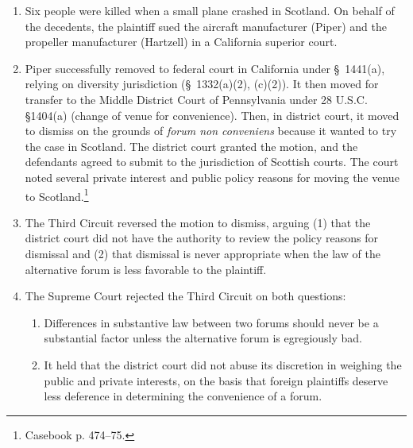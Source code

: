 \begin{enumerate}
    \item Six people were killed when a small plane crashed in Scotland. On 
    behalf of the decedents, the plaintiff sued the aircraft manufacturer 
    (Piper) and the propeller manufacturer (Hartzell) in a California superior 
    court.
    \item Piper successfully removed to federal court in California under \S\ 
    1441(a), relying on diversity jurisdiction (\S\ 1332(a)(2), (c)(2)). It 
    then moved for transfer to the Middle District Court of Pennsylvania under 
    28 U.S.C. §1404(a) (change of venue for convenience). Then, in district 
    court, it moved to dismiss on the grounds of \emph{forum non conveniens} 
    because it wanted to try the case in Scotland. The district court granted 
    the motion, and the defendants agreed to submit to the jurisdiction of 
    Scottish courts.  The court noted several private interest and public 
    policy reasons for moving the venue to Scotland.\footnote{Casebook p.  
    474--75.}
    \item The Third Circuit reversed the motion to dismiss, arguing (1) that 
    the district court did not have the authority to review the policy reasons 
    for dismissal and (2) that dismissal is never appropriate when the law of 
    the alternative forum is less favorable to the plaintiff.
    \item The Supreme Court rejected the Third Circuit on both questions:
    \begin{enumerate}
        \item Differences in substantive law between two forums should never 
        be a substantial factor unless the alternative forum is egregiously 
        bad.
        \item It held that the district court did not abuse its discretion in 
        weighing the public and private interests, on the basis that foreign 
        plaintiffs deserve less deference in determining the convenience of a 
        forum.
    \end{enumerate}
\end{enumerate}
